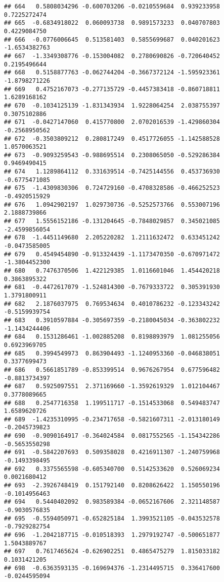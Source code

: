 \documentclass[
]{article}
\begin{document}
\begin{verbatim}
## 664   0.5808034296 -0.600703206 -0.0210559684  0.939233958  0.7225272474
## 665  -0.6834918022  0.060093738  0.9891573233  0.040707803  0.4229084750
## 666  -0.0776006645  0.513581403  0.5855699687  0.040201623 -1.6534382763
## 667  -1.3349308776 -0.153004082  0.2780690826 -0.720640452  0.2195496644
## 668   0.5158877763 -0.062744204 -0.3667372124 -1.595923361 -1.8798271226
## 669   0.4752167073 -0.277135729 -0.4457383418 -0.860718811  1.6289168162
## 670  -0.1034125139 -1.831343934  1.9228064254  2.038755397  0.3075102886
## 671  -0.0427147060  0.415770800  2.0702016539 -1.429860304 -0.2568950562
## 672  -0.3503809212  0.280817249  0.4517726055 -1.142588528  1.0570063521
## 673  -0.9093259543 -0.988695514  0.2308065050 -0.529286384  0.9469490415
## 674   1.1289864112  0.331639514 -0.7425144556  0.453736930 -0.6775471085
## 675  -1.4309830306  0.724729160 -0.4708328586 -0.466252523 -0.4920515929
## 676   1.0942902197  1.029730736 -0.5252573766  0.553007196  2.1888739866
## 677   1.5556152186 -0.131204645 -0.7848029857  0.345021085 -2.4599856054
## 678  -1.4451149680  2.205220282  1.2111632472  0.633451242 -0.0473585005
## 679   0.4549454890 -0.913324439 -1.1173470350 -0.670971472 -1.3804452300
## 680   0.7476370506  1.422129385  1.0116601046  1.454420218  0.3863895322
## 681  -0.4472617079 -1.524814300 -0.7679333722  0.305391930  1.3791800911
## 682   2.1876037975  0.769534634  0.4010786232 -0.123343242 -0.5159939754
## 683   0.3910597884 -0.305697359 -0.2180045034 -0.363802232 -1.1434244406
## 684   0.1531286461 -1.002885208  0.8198893979  1.081255056  0.6923969705
## 685   0.3994549973  0.863904493 -1.1240953360 -0.046838051  0.3377699473
## 686   0.5661851789 -0.853399514  0.9676267954  0.677596482 -0.8813734397
## 687   0.5925097551  2.371169660 -1.3592619329  1.012104467  0.3778089665
## 688   0.2547716358  1.199511717 -0.1514533068  0.549483747  1.6589620726
## 689  -1.4235310995 -0.234717658 -0.5821607311 -2.013180149 -0.2045739823
## 690  -0.9090164917 -0.364024584  0.0817552565 -1.154342286 -0.5653550298
## 691  -0.5842207693  0.509358028  0.4216911307 -1.240759968 -0.1493398495
## 692   0.3375565598 -0.605340700  0.5142533620  0.526069234  0.0021680412
## 693  -2.3926748419  0.151792140  0.8208626422  1.150550196 -0.1014956463
## 694   0.5440402092  0.983589384 -0.0652167606  2.321148587 -0.9030576835
## 695  -0.5594050971 -0.652825184  1.3993521105 -0.043532578 -0.7929282754
## 696  -1.2042187715 -0.010518393  1.2979192747 -0.500651877  1.5043889767
## 697   0.7617465624 -0.626902251  0.4865475279  1.815033182  0.1031421205
## 698  -0.6363593135 -0.169694376 -1.2314495715  0.336417600 -0.0244595094

\end{verbatim}
\end{document}
